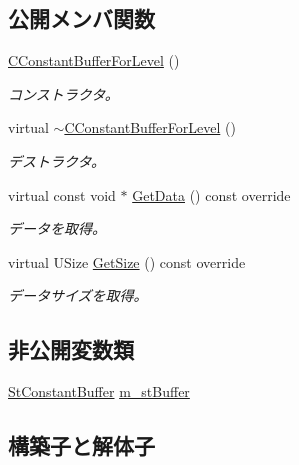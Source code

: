 \subsection*{公開メンバ関数}
\begin{DoxyCompactItemize}
\item 
\hyperlink{class_c_constant_buffer_for_level_a6dfcab6b58a853ba7225240a017753f8}{C\+Constant\+Buffer\+For\+Level} ()
\begin{DoxyCompactList}\small\item\em コンストラクタ。 \end{DoxyCompactList}\item 
virtual \hyperlink{class_c_constant_buffer_for_level_aef0faa964f193e24f9ce6b39dc17da89}{$\sim$\+C\+Constant\+Buffer\+For\+Level} ()
\begin{DoxyCompactList}\small\item\em デストラクタ。 \end{DoxyCompactList}\item 
virtual const void $\ast$ \hyperlink{class_c_constant_buffer_for_level_a2de25b6e96d4ed77ab5e598389b3bd08}{Get\+Data} () const  override
\begin{DoxyCompactList}\small\item\em データを取得。 \end{DoxyCompactList}\item 
virtual U\+Size \hyperlink{class_c_constant_buffer_for_level_a5d653c0978f370dcef86eece263871dd}{Get\+Size} () const  override
\begin{DoxyCompactList}\small\item\em データサイズを取得。 \end{DoxyCompactList}\end{DoxyCompactItemize}
\subsection*{非公開変数類}
\begin{DoxyCompactItemize}
\item 
\hyperlink{struct_c_constant_buffer_for_level_1_1_st_constant_buffer}{St\+Constant\+Buffer} \hyperlink{class_c_constant_buffer_for_level_a6b99c7a9716d8a6dc2c5619de2026d40}{m\+\_\+st\+Buffer}
\end{DoxyCompactItemize}


\subsection{構築子と解体子}
\hypertarget{class_c_constant_buffer_for_level_a6dfcab6b58a853ba7225240a017753f8}{}
